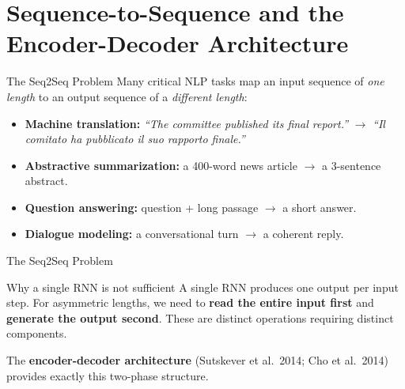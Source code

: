 \documentclass[aspectratio=169]{beamer}
\begin{document}
\section{Sequence-to-Sequence and the Encoder-Decoder Architecture}
%
\begin{frame}{The Seq2Seq Problem}
Many critical NLP tasks map an input sequence of \emph{one length} to an output
sequence of a \emph{different length}:
\begin{itemize}
    \item \textbf{Machine translation:}
          \emph{``The committee published its final report.''} $\to$
          \emph{``Il comitato ha pubblicato il suo rapporto finale.''}
    \item \textbf{Abstractive summarization:} a 400-word news article $\to$ a 3-sentence abstract.
    \item \textbf{Question answering:} question + long passage $\to$ a short answer.
    \item \textbf{Dialogue modeling:} a conversational turn $\to$ a coherent reply.
\end{itemize}
\end{frame}
%
%
\begin{frame}{The Seq2Seq Problem}
\vspace{0.15cm}
\begin{block}{Why a single RNN is not sufficient}
A single RNN produces one output per input step.
For asymmetric lengths, we need to \textbf{read the entire input first} and
\textbf{generate the output second}.
These are distinct operations requiring distinct components.
\end{block}

\vspace{0.1cm}
The \textbf{encoder-decoder architecture} (Sutskever et al.\ 2014; Cho et al.\ 2014)
provides exactly this two-phase structure.
\end{frame}
%
%
\end{document}
